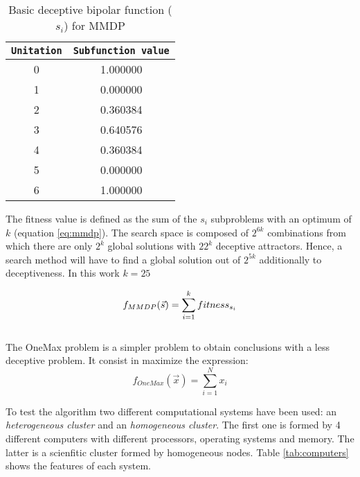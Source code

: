 \documentclass{sig-alternate}
\begin{document}
\begin{table}[h]

\centering
{\scriptsize
\begin{tabular}{|c|c|}
\hline
\texttt{Unitation}&\texttt{Subfunction value}\\
\hline
0 & 1.000000 \\
\hline
1 & 0.000000 \\
\hline
2 & 0.360384 \\
\hline
3 & 0.640576\\
\hline
4 & 0.360384\\
\hline
5 & 0.000000\\
\hline
6 & 1.000000\\
\hline

\end{tabular}
}
\caption{ Basic deceptive bipolar function ($s_i$) for MMDP
\label{table:mmdp}}
\end{table}



The fitness value is defined as the sum of the $s_i$ subproblems with an optimum of $k$ (equation \ref{eq:mmdp}).
The search space is composed of $2^{6k}$ combinations from which there
are only $2^k$ global solutions with $22^k$ deceptive
attractors. Hence, a search method will have to find a global solution
out of $2^{5k}$ additionally to deceptiveness. In this work $k=25$

\begin{equation}\label{eq:mmdp}
\scriptsize
f_{MMDP}(\vec s)= \sum_{i=1}^{k} fitness_{s_i}
\end{equation}\\

The OneMax problem is a simpler problem to obtain conclusions with a less deceptive problem. It consist in maximize the expression:
\begin{equation}
f_{OneMax}(\vec{x}) = \sum_{i=1}^{N}{x_{i}}
\end{equation}


To test the algorithm two different computational systems have been used: an {\em heterogeneous cluster} and an {\em homogeneous cluster}. The first one is formed by 4 different computers with different processors, operating systems and memory. The latter is a scienfitic cluster formed by homogeneous nodes. Table \ref{tab:computers} shows the features of each system.
\end{document}
